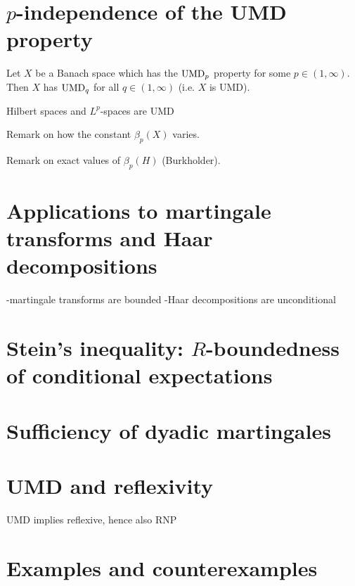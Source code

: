 \section{$p$-independence of the UMD property}\label{sec:UMD-p-independence}

\begin{thm}
  Let $X$ be a Banach space which has the $\mathrm{UMD}_{p}$ property for some $p \in (1,\infty)$.
  Then $X$ has $\mathrm{UMD}_{q}$ for all $q \in (1,\infty)$ (i.e. $X$ is UMD).
\end{thm}

\begin{cor}
  Hilbert spaces and $L^p$-spaces are UMD
\end{cor}

\begin{rmk}
  Remark on how the constant $\beta_{p}(X)$ varies.
\end{rmk}

\begin{rmk}
  Remark on exact values of $\beta_{p}(H)$ (Burkholder).
\end{rmk}

\section{Applications to martingale transforms and Haar decompositions}

-martingale transforms are bounded
-Haar decompositions are unconditional

\section{Stein's inequality: $R$-boundedness of conditional expectations}

\section{Sufficiency of dyadic martingales}

\section{UMD and reflexivity}

UMD implies reflexive, hence also RNP

\section{Examples and counterexamples}

